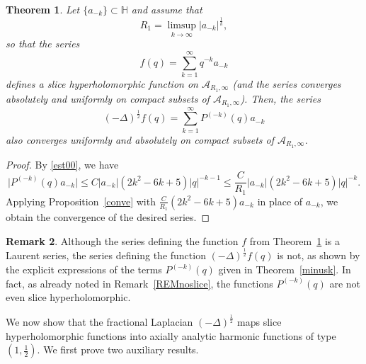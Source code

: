 \documentclass[reqno,11pt]{amsart}
\newtheorem{theorem}{Theorem}[section]
\theoremstyle{definition}
\newtheorem{remark}[theorem]{Remark}
\begin{document}
\begin{theorem}
	\label{main1}
	Let $\{a_{-k}\}\subset \mathbb{H}$ and assume that
	\[
	R_1= \limsup_{k\to \infty} |a_{-k}|^\frac{1}{k},
	\]
	so that the series
	\[
	f(q)=\sum_{k=1}^\infty q^{-k}a_{-k}
	\]
	defines a slice hyperholomorphic function on $\mathcal{A}_{R_1,\infty}$ (and the series converges absolutely and uniformly on compact subsets of  $\mathcal{A}_{R_1,\infty}$). Then, the series
	\[
	(-\Delta)^\frac{1}{2} f(q) =\sum_{k=1}^\infty P^{(-k)}(q) a_{-k}
	\]
	also converges uniformly and absolutely on compact subsets of $\mathcal{A}_{R_1,\infty}$.
\end{theorem}
\begin{proof}
	By \eqref{est00}, we have
	\[
	\big|P^{(-k)}(q) a_{-k} \big| \leq C |a_{-k}| (2k^2-6k+5)|q|^{-k-1} \leq \frac{C}{R_1} |a_{-k}| (2k^2-6k+5) |q|^{-k}.
	\]
	Applying Proposition~\ref{conve} with $\frac{C}{R_1}  (2k^2-6k+5)a_{-k}$ in place of $a_{-k}$, we obtain the convergence of the desired series.
\end{proof}


\begin{remark}
	Although the series defining  the function $f$ from Theorem~\ref{main1} is a Laurent series, the series defining the function $(-\Delta)^\frac{1}{2} f(q) $ is not, as shown by the explicit expressions of the terms $P^{(-k)}(q)$ given in Theorem~\ref{minusk}. In fact, as already noted in Remark~\ref{REMnoslice}, the functions $P^{(-k)}(q)$ are not even slice hyperholomorphic.
\end{remark}

We now show that the fractional Laplacian $(-\Delta)^\frac{1}{2}$ maps slice hyperholomorphic functions into axially analytic harmonic functions of type $(1,\frac{1}{2})$. We first prove two auxiliary results.
\end{document}
